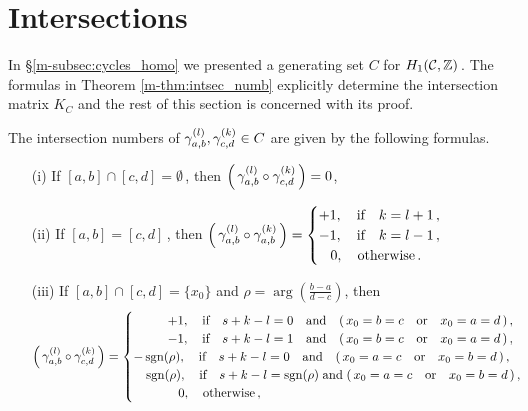 \documentclass[main.tex]{subfiles}
\begin{document}
  \section{Intersections}\label{sec:intersections}

  In \S \ref{m-subsec:cycles_homo} we presented a generating set $C$ for $H_1(\mathcal{C},\mathbb{Z})$\,. The formulas in Theorem \ref{m-thm:intsec_numb} explicitly determine the intersection matrix $K_C$ and
  the rest of this section is concerned with its proof.
  
  \begin{thm}\label{thm:intsec_numb}
      The intersection numbers of $\gamma_{a,b}^{(l)}, \gamma_{c,d}^{(k)} \in C$ are given by the following formulas.
      \begin{itemize}
       \item[(i)] If $[a,b] \cap [c,d] = \emptyset$\,, then $\left(\,\gamma_{a,b}^{(l)} \circ \gamma_{c,d}^{(k)}\,\right) = 0$, 
       \item[(ii)] If $[a,b] = [c,d]$\,, then $\left(\,\gamma_{a,b}^{(l)} \circ \gamma_{a,b}^{(k)}\,\right) = \begin{cases}
	 +1, \quad \text{if} \quad k = l+1\,, \\
	 -1, \quad \text{if} \quad k = l-1\,, \\
	  \quad\! 0, \quad \text{otherwise}\,.
	\end{cases}$
      \item[(iii)] If $[a,b] \cap [c,d] = \{x_0\}$ and $\rho = \arg\left(\frac{b-a}{d-c}\right)$, then
      \begin{align*}
       \left(\,\cyabl \circ \cycdk\,\right) = \begin{cases}
            \hspace*{0.95cm} +1, \quad  \text{if} \quad s+k-l=0 \quad \text{and} \quad (\,x_0 = b = c \quad \text{or} \quad x_0 = a = d\,)\,,\\
	     \hspace*{0.95cm} -1, \quad \text{if} \quad s+k-l=1 \quad \text{and} \quad (\,x_0 = b = c \quad \text{or} \quad x_0 = a = d\,)\,,\\
           -\sgn(\rho), \quad  \text{if} \quad s+k-l=0 \quad \text{and} \quad (\,x_0 = a = c \quad \text{or} \quad x_0 = b = d\,)\,,\\
           \quad \sgn(\rho), \quad  \text{if} \quad s+k-l=\sgn(\rho) \; \text{and} \; (\,x_0 = a = c \quad \text{or} \quad x_0 = b = d\,)\,,\\
         \hspace*{0.95cm}  \quad\! 0, \quad \text{otherwise}\,,
        \end{cases}

\end{align*}
\end{itemize}
\end{thm}
\end{document}
